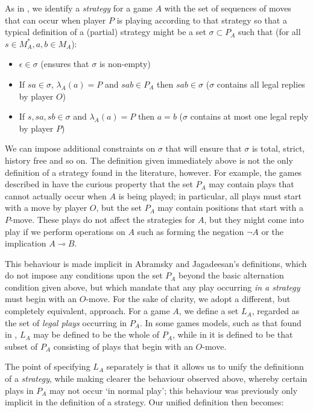 \documentclass[11pt]{article} %
\theoremstyle{plain} %
\theoremstyle{definition} %
\theoremstyle{note}
\theoremstyle{exercisestyle}
\renewcommand{\implies}{\multimap}
\newcommand{\emptyplay}{\epsilon}
\begin{document}
As in \cite{abramskyjagadeesangames}, we identify a \emph{strategy} for a game $A$ with the set of sequences of moves that can occur when player $P$ is playing according to that strategy so that a typical definition of a (partial) strategy might be a set $\sigma\subset P_A$ such that (for all $s\in M_A^*, a,b\in M_A$):
\begin{itemize}
  \item $\emptyplay\in\sigma$ (ensures that $\sigma$ is non-empty)
  \item If $sa\in\sigma$, $\lambda_A(a)=P$ and $sab\in P_A$ then $sab\in\sigma$ ($\sigma$ contains all legal replies by player $O$)
  \item If $s,sa,sb\in\sigma$ and $\lambda_A(a)=P$ then $a=b$ ($\sigma$ contains at most one legal reply by player $P$)
\end{itemize}

We can impose additional constraints on $\sigma$ that will ensure that $\sigma$ is total, strict, history free and so on.  The definition given immediately above is not the only definition of a strategy found in the literature, however.  For example, the games described in \cite{abramskyjagadeesangames} have the curious property that the set $P_A$ may contain plays that cannot actually occur when $A$ is being played; in particular, all plays must start with a move by player $O$, but the set $P_A$ may contain positions that start with a $P$-move.  These plays do not affect the strategies for $A$, but they might come into play if we perform operations on $A$ such as forming the negation $\neg A$ or the implication $A\implies B$.  

This behaviour is made implicit in Abramsky and Jagadeesan's definitions, which do not impose any conditions upon the set $P_A$ beyond the basic alternation condition given above, but which mandate that any play occurring \emph{in a strategy} must begin with an $O$-move.  For the sake of clarity, we adopt a different, but completely equivalent, approach.  For a game $A$, we define a set $L_A$, regarded as the set of \emph{legal plays} occurring in $P_A$.  In some games models, such as that found in \cite{blassgames}, $L_A$ may be defined to be the whole of $P_A$, while in \cite{abramskyjagadeesangames} it is defined to be that subset of $P_A$ consisting of plays that begin with an $O$-move.

The point of specifying $L_A$ separately is that it allows us to unify the definitionn of a \emph{strategy}, while making clearer the behaviour observed above, whereby certain plays in $P_A$ may not occur `in normal play'; this behaviour was previously only implicit in the definition of a strategy.  Our unified definition then becomes:
\end{document}
